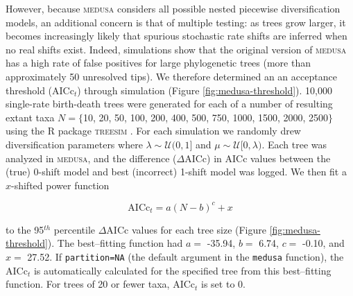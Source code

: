 However, because \textsc{medusa} considers all possible nested piecewise diversification models, an additional concern is that of multiple testing: as trees grow larger, it becomes increasingly likely that spurious stochastic rate shifts are inferred when no real shifts exist. Indeed, simulations show that the original version of \textsc{medusa} has a high rate of false positives for large phylogenetic trees (more than approximately 50 unresolved tips). We therefore determined an an acceptance threshold (AICc$_t$) through simulation (Figure \ref{fig:medusa-threshold}). 10,000 single-rate birth-death trees were generated for each of a number of resulting extant taxa $N = \lbrace$10, 20, 50, 100, 200, 400, 500, 750, 1000, 1500, 2000, 2500$\rbrace$ using the R package \textsc{treesim} \citep{treesim}. For each simulation we randomly drew diversification parameters where $\lambda \sim \mathcal{U}(0,1]$ and $\mu \sim \mathcal{U}[0, \lambda)$. Each tree was analyzed in \textsc{medusa}, and the difference ($\Delta$AICc) in AICc values between the (true) 0-shift model and best (incorrect) 1-shift model was logged. We then fit a $x$-shifted power function

\begin{equation}
\mathrm{AICc}_{t} = a (N - b)^{c} + x 
\end{equation}

to the 95$^{th}$ percentile $\Delta$AICc values for each tree size (Figure \ref{fig:medusa-threshold}). The best--fitting function had $a =$ -35.94, $b =$ 6.74, $c =$ -0.10, and $x =$ 27.52. If \texttt{partition=NA} (the default argument in the \texttt{medusa} function), the AICc$_{t}$ is automatically calculated for the specified tree from this best--fitting function. For trees of 20 or fewer taxa, AICc$_{t}$ is set to 0.

